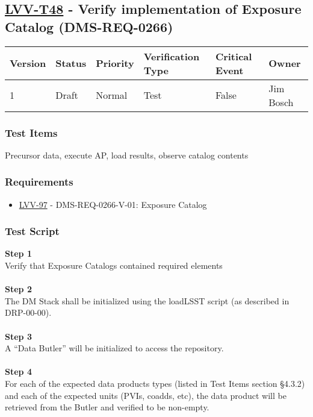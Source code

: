 \hypertarget{lvv-t48---verify-implementation-of-exposure-catalog-dms-req-0266}{%
\subsection{\texorpdfstring{\href{https://jira.lsstcorp.org/secure/Tests.jspa\#/testCase/LVV-T48}{LVV-T48}
- Verify implementation of Exposure Catalog
(DMS-REQ-0266)}{LVV-T48 - Verify implementation of Exposure Catalog (DMS-REQ-0266)}}\label{lvv-t48---verify-implementation-of-exposure-catalog-dms-req-0266}}

\begin{longtable}[]{@{}llllll@{}}
\toprule
Version & Status & Priority & Verification Type & Critical Event &
Owner\tabularnewline
\midrule
\endhead
1 & Draft & Normal & Test & False & Jim Bosch\tabularnewline
\bottomrule
\end{longtable}

\hypertarget{test-items-24}{%
\subsubsection{Test Items}\label{test-items-24}}

Precursor data, execute AP, load results, observe catalog contents

\hypertarget{requirements-25}{%
\subsubsection{Requirements}\label{requirements-25}}

\begin{itemize}
\tightlist
\item
  \href{https://jira.lsstcorp.org/browse/LVV-97}{LVV-97} -
  DMS-REQ-0266-V-01: Exposure Catalog
\end{itemize}

\hypertarget{test-script-25}{%
\subsubsection{Test Script}\label{test-script-25}}

\textbf{Step 1}\\
Verify that Exposure Catalogs contained required elements\\
~\\
\textbf{Step 2}\\
The DM Stack shall be initialized using the loadLSST script (as
described in DRP-00-00).\\
~\\
\textbf{Step 3}\\
A ``Data Butler'' will be initialized to access the repository.\\
~\\
\textbf{Step 4}\\
For each of the expected data products types (listed in Test Items
section §4.3.2) and each of the expected units (PVIs, coadds, etc), the
data product will be retrieved from the Butler and verified to be
non-empty.\\
~\\
~\\
~\\

